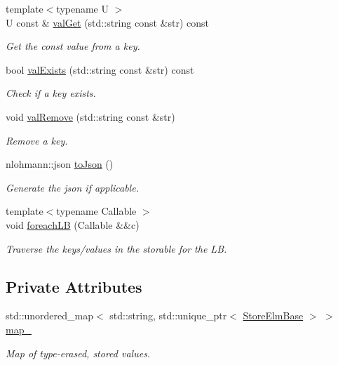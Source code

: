 \begin{DoxyCompactItemize}
{\footnotesize template$<$typename U $>$ }\\U const  \& \hyperlink{structvt_1_1vrt_1_1collection_1_1storage_1_1_storable_a5014622ff587047270462efeca4ca2dd}{val\+Get} (std\+::string const \&str) const
\begin{DoxyCompactList}\small\item\em Get the const value from a key. \end{DoxyCompactList}\item 
bool \hyperlink{structvt_1_1vrt_1_1collection_1_1storage_1_1_storable_a46884264a54e5be7fc231208dc468b8e}{val\+Exists} (std\+::string const \&str) const
\begin{DoxyCompactList}\small\item\em Check if a key exists. \end{DoxyCompactList}\item 
void \hyperlink{structvt_1_1vrt_1_1collection_1_1storage_1_1_storable_a760fb8a543d0684b259fdbf078bcafb8}{val\+Remove} (std\+::string const \&str)
\begin{DoxyCompactList}\small\item\em Remove a key. \end{DoxyCompactList}\item 
nlohmann\+::json \hyperlink{structvt_1_1vrt_1_1collection_1_1storage_1_1_storable_afc24cbef1191dfd0457575ddd28b12d9}{to\+Json} ()
\begin{DoxyCompactList}\small\item\em Generate the json if applicable. \end{DoxyCompactList}\item 
{\footnotesize template$<$typename Callable $>$ }\\void \hyperlink{structvt_1_1vrt_1_1collection_1_1storage_1_1_storable_a8788e4d3df88f0c82c74a05cc4e328f3}{foreach\+LB} (Callable \&\&c)
\begin{DoxyCompactList}\small\item\em Traverse the keys/values in the storable for the LB. \end{DoxyCompactList}\end{DoxyCompactItemize}
\subsection*{Private Attributes}
\begin{DoxyCompactItemize}
\item 
std\+::unordered\+\_\+map$<$ std\+::string, std\+::unique\+\_\+ptr$<$ \hyperlink{structvt_1_1vrt_1_1collection_1_1storage_1_1_store_elm_base}{Store\+Elm\+Base} $>$ $>$ \hyperlink{structvt_1_1vrt_1_1collection_1_1storage_1_1_storable_ade35c0e0ef45b53ffad56cbc349cfb82}{map\+\_\+}
\begin{DoxyCompactList}\small\item\em Map of type-\/erased, stored values. \end{DoxyCompactList}\end{DoxyCompactItemize}


